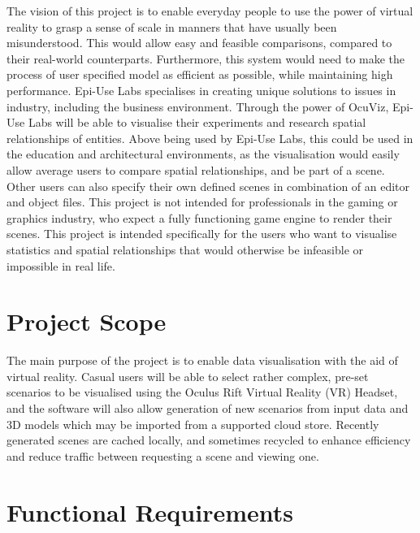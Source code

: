 \documentclass[a4paper,12pt]{article}
\begin{document}
	The vision of this project is to enable everyday people to use the power of virtual reality to grasp a sense of scale in manners that have usually been misunderstood. This would allow easy and feasible comparisons, compared to their real-world counterparts. Furthermore, this system would need to make the process of user specified model as efficient as possible, while maintaining high performance. 
	\newline\newline
	Epi-Use Labs specialises in creating unique solutions to issues in industry, including the business environment. Through the power of OcuViz, Epi-Use Labs will be able to visualise their experiments and research spatial relationships of entities.
	\newline
	Above being used by Epi-Use Labs, this could be used in the education and architectural environments, as the visualisation would easily allow average users to compare spatial relationships, and be part of a scene. Other users can also specify their own defined scenes in combination of an editor and object files.
	\newline
	This project is not intended for professionals in the gaming or graphics industry, who expect a fully functioning game engine to render their scenes. This project is intended specifically for the users who want to visualise statistics and spatial relationships that would otherwise be infeasible or impossible in real life.
%
%




\section{Project Scope}		%

	The main purpose of the project is to enable data visualisation with the aid of virtual reality. Casual users will be able to select rather complex, pre-set scenarios to be visualised using the Oculus Rift Virtual Reality (VR) Headset, and the software will also allow generation of new scenarios from input data and 3D models which may be imported from a supported cloud store. Recently generated scenes are cached locally, and sometimes recycled to enhance efficiency and reduce traffic between requesting a scene and viewing one.
%
%
\newpage
\section{Functional Requirements}
\end{document}

